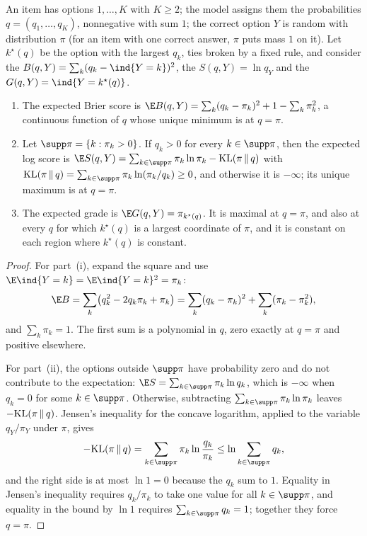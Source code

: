 \begin{refsection}
\begin{proposition}\label{prop:emergence:proper}
An item has options $1,\dots,K$ with $K\ge2$; the model assigns them the probabilities $q=(q_1,\dots,q_K)$, nonnegative with sum $1$; the correct option $Y$ is random with distribution $\pi$ (for an item with one correct answer, $\pi$ puts mass $1$ on it). Let $k^\star(q)$ be the option with the largest $q_k$, ties broken by a fixed rule, and consider the  $B(q,Y)=\sum_k(q_k-\ind\{Y=k\})^2$, the  $S(q,Y)=\ln q_Y$ and the  $G(q,Y)=\ind\{Y=k^\star(q)\}$.
\begin{enumerate}
\item The expected Brier score is $\E B(q,Y)=\sum_k(q_k-\pi_k)^2+1-\sum_k\pi_k^2$, a continuous function of $q$ whose unique minimum is at $q=\pi$.
\item Let $\supp\pi=\{k:\pi_k>0\}$. If $q_k>0$ for every $k\in\supp\pi$, then the expected log score is $\E S(q,Y)=\sum_{k\in\supp\pi}\pi_k\ln\pi_k-\emergenceKL(\pi\,\|\,q)$ with $\emergenceKL(\pi\,\|\,q)=\sum_{k\in\supp\pi}\pi_k\ln(\pi_k/q_k)\ge0$, and otherwise it is $-\infty$; its unique maximum is at $q=\pi$.
\item The expected grade is $\E G(q,Y)=\pi_{k^\star(q)}$. It is maximal at $q=\pi$, and also at every $q$ for which $k^\star(q)$ is a largest coordinate of $\pi$, and it is constant on each region where $k^\star(q)$ is constant.
\end{enumerate}
\end{proposition}

\begin{proof}
For part~(i), expand the square and use $\E\ind\{Y=k\}=\E\ind\{Y=k\}^2=\pi_k$:
\[
\E B=\sum_k\bigl(q_k^2-2q_k\pi_k+\pi_k\bigr)=\sum_k(q_k-\pi_k)^2+\sum_k(\pi_k-\pi_k^2),
\]
and $\sum_k\pi_k=1$. The first sum is a polynomial in $q$, zero exactly at $q=\pi$ and positive elsewhere.

For part~(ii), the options outside $\supp\pi$ have probability zero and do not contribute to the expectation: $\E S=\sum_{k\in\supp\pi}\pi_k\ln q_k$, which is $-\infty$ when $q_k=0$ for some $k\in\supp\pi$. Otherwise, subtracting $\sum_{k\in\supp\pi}\pi_k\ln\pi_k$ leaves $-\mathrm{KL}(\pi\,\|\,q)$. Jensen's inequality for the concave logarithm, applied to the variable $q_Y/\pi_Y$ under $\pi$, gives
\[
-\emergenceKL(\pi\,\|\,q)=\sum_{k\in\supp\pi}\pi_k\ln\frac{q_k}{\pi_k}\le\ln\sum_{k\in\supp\pi}q_k,
\]
and the right side is at most $\ln1=0$ because the $q_k$ sum to $1$. Equality in Jensen's inequality requires $q_k/\pi_k$ to take one value for all $k\in\supp\pi$, and equality in the bound by $\ln1$ requires $\sum_{k\in\supp\pi}q_k=1$; together they force $q=\pi$.


\end{proof}
\end{refsection}
